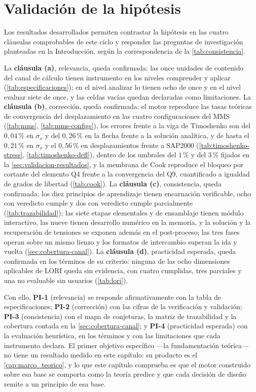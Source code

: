 \section{Validación de la hipótesis}
\label{sec:validacion-hipotesis}

Los resultados desarrollados permiten contrastar la hipótesis en las cuatro cláusulas comprobables de este ciclo y responder las preguntas de investigación planteadas en la Introducción, según la correspondencia de la \autoref{tab:consistencia}.

La \textbf{cláusula (a)}, relevancia, queda confirmada: las once unidades de contenido del canal de cálculo tienen instrumento en los niveles comprender y aplicar (\autoref{tab:especificaciones}); en el nivel analizar lo tienen ocho de once y en el nivel evaluar siete de once, y las celdas vacías quedan declaradas como limitaciones. La \textbf{cláusula (b)}, corrección, queda confirmada: el motor reproduce las tasas teóricas de convergencia del desplazamiento en las cuatro configuraciones del MMS (\autoref{tab:mms}, \autoref{tab:mms-configs}), los errores frente a la viga de Timoshenko son del $0{,}04\,\%$ en $\sigma_x$ y del $0{,}26\,\%$ en la flecha frente a la solución analítica, y de hasta el $0{,}21\,\%$ en $\sigma_x$ y el $0{,}56\,\%$ en desplazamientos frente a SAP2000 (\autoref{tab:timoshenko-stress}, \autoref{tab:timoshenko-defl}), dentro de los umbrales del $1\,\%$ y del $3\,\%$ fijados en la \autoref{sec:validacion-resultados}, y la membrana de Cook reproduce el bloqueo por cortante del elemento Q4 frente a la convergencia del Q9, cuantificado a igualdad de grados de libertad (\autoref{tab:cook}). La \textbf{cláusula (c)}, consistencia, queda confirmada: los diez principios de aprendizaje tienen encarnación verificable, ocho con veredicto cumple y dos con veredicto cumple parcialmente (\autoref{tab:trazabilidad}); las siete etapas elementales y de ensamblaje tienen módulo interactivo, las nueve tienen desarrollo numérico en la memoria, y la solución y la recuperación de tensiones se exponen además en el post-proceso; las tres fases operan sobre un mismo lienzo y los formatos de intercambio superan la ida y vuelta (\autoref{sec:cobertura-canal}). La \textbf{cláusula (d)}, practicidad esperada, queda confirmada en los términos de su criterio: ninguna de las ocho dimensiones aplicables de LORI queda sin evidencia, con cuatro cumplidas, tres parciales y una no evaluable sin usuarios (\autoref{tab:lori}).

Con ello, \textbf{PI-1} (relevancia) se responde afirmativamente con la tabla de especificaciones; \textbf{PI-2} (corrección) con las cifras de la verificación y validación; \textbf{PI-3} (consistencia) con el mapa de conjeturas, la matriz de trazabilidad y la cobertura contada en la \autoref{sec:cobertura-canal}; y \textbf{PI-4} (practicidad esperada) con la evaluación heurística, en los términos y con las limitaciones que cada instrumento declara. El primer objetivo específico —la fundamentación teórica— no tiene un resultado medido en este capítulo: su producto es el \autoref{cap:marco_teorico}, y lo que este capítulo comprueba es que el motor construido sobre esa base se comporta como la teoría predice y que cada decisión de diseño remite a un principio de esa base.

